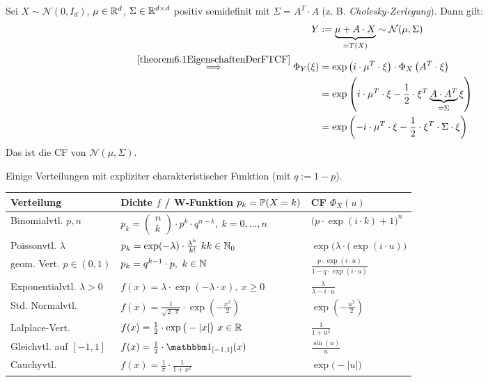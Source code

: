 \begin{beisp}\enter
Sei $X\sim\mathcal{N}(0,I_d)$, $\mu\in\R^d$, $\Sigma\in\R^{d\times d}$ positiv semidefinit mit $\Sigma=A^T\cdot A$ (z. B. \textit{Cholesky-Zerlegung}). Dann gilt:
\begin{align*}
Y&:=\underbrace{\mu+A\cdot X}_{=T(X)}\sim\mathcal{N}(\mu,\Sigma)\\
\overset{\ref{theorem6.1EigenschaftenDerFTCF}}{\implies}
\Phi_Y(\xi)&=\exp\left(i\cdot\mu^T\cdot \xi\right)\cdot\Phi_X\left(A^T\cdot\xi\right)\\
&=\exp\left(i\cdot\mu^T\cdot\xi-\frac{1}{2}\cdot\xi^T\underbrace{ A\cdot A^T}_{=\Sigma}\xi\right)\\
&=\exp\left(-i\cdot\mu^T\cdot\xi-\frac{1}{2}\cdot\xi^T\cdot\Sigma\cdot\xi\right)
\end{align*}
Das ist die CF von $\mathcal{N}(\mu,\Sigma)$.
\end{beisp}

\begin{beisp}
Einige Verteilungen mit expliziter charakteristischer Funktion (mit $q:=1-p$).\nl
\begin{tabular}{l|l|l}
Verteilung & Dichte $f$ / W-Funktion $p_k=\P(X=k)$ & CF $\Phi_X(u)$\\ \hline\hline
Binomialvtl. $p,n$ & $p_k=\begin{pmatrix}
n\\ k
\end{pmatrix}\cdot p^k\cdot q^{n-k},~k=0,\ldots, n$ & $\big(p\cdot\exp(i\cdot k)+1\big)^n$\\ \hline
Poissonvtl. $\lambda$ & $p_k=\exp(-\lambda)\cdot\frac{\lambda^k}{k!}~kk\in\N_0$ & $\exp\big(\lambda\cdot(\exp(i\cdot u)\big)$ \\ \hline
geom. Vert. $p\in(0,1)$ & $p_k=q^{k-1}\cdot p,~k\in\N$ & $\frac{p\cdot\exp(i\cdot u)}{1-q\cdot\exp(i\cdot u)}$ \\ \hline
Exponentialvtl. $\lambda>0$ & $f(x)=\lambda\cdot\exp(-\lambda\cdot x),~x\geq0$ & $\frac{\lambda}{\lambda-i\cdot u}$\\ \hline
Std. Normalvtl. & $f(x)=\frac{1}{\sqrt{2\cdot \pi}}\cdot\exp\left(-\frac{x^2}{2}\right)$ & $\exp\left(-\frac{u^2}{2}\right)$\\ \hline
Lalplace-Vert. & $f(x)=\frac{1}{2}\cdot\exp\big(-|x|\big)~x\in\R$ & $\frac{1}{1+u^2}$\\ \hline
Gleichvtl. auf $[-1,1]$ & $f(x)=\frac{1}{2}\cdot\indi_{[-1,1]}(x)$ & $\frac{\sin(u)}{u}$\\ \hline
Cauchyvtl. & $f(x)=\frac{1}{\pi}\cdot\frac{1}{1+x^2}$ & $\exp\big(-|u|\big)$
\end{tabular}
\end{beisp}

